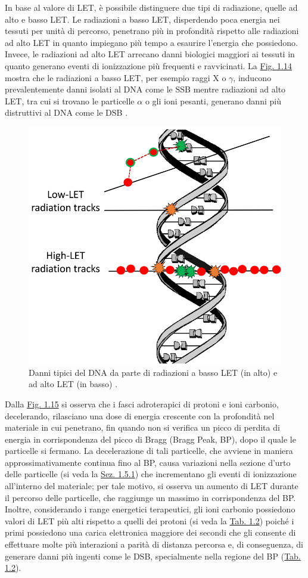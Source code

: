 \documentclass[12pt,a4paper,twoside]{report}
\begin{document}
	In base al valore di LET, è possibile distinguere due tipi di radiazione, quelle ad alto e basso LET. Le radiazioni a basso LET, disperdendo poca energia nei tessuti per unità di percorso, penetrano più in profondità rispetto alle radiazioni ad alto LET in quanto impiegano più tempo a esaurire l'energia che possiedono. Invece, le radiazioni ad alto LET arrecano danni biologici maggiori ai tessuti in quanto generano eventi di ionizzazione più frequenti e ravvicinati. La \hyperref[fig:damage_let]{Fig. 1.14} mostra che le radiazioni a basso LET, per esempio raggi X o $\gamma$, inducono prevalentemente danni isolati al DNA come le SSB mentre radiazioni ad alto LET, tra cui si trovano le particelle $\alpha$ o gli ioni pesanti, generano danni più distruttivi al DNA come le DSB \cite{Roobol2020-fp}.
	\begin{figure}[H]
		\centering
		\includegraphics[width=0.6\linewidth]{damage_let.png}
		\caption{Danni tipici del DNA da parte di radiazioni a basso LET (in alto) e ad alto LET (in basso) \cite{Fabbrizi_Parsons_2022}.}
		\label{fig:damage_let}
	\end{figure}
	Dalla \hyperref[fig:proton_carbon_let]{Fig. 1.15} si osserva che i fasci adroterapici di protoni e ioni carbonio, decelerando, rilasciano una dose di energia crescente con la profondità nel materiale in cui penetrano, fin quando non si verifica un picco di perdita di energia in corrispondenza del picco di Bragg (Bragg Peak, BP), dopo il quale le particelle si fermano. La decelerazione di tali particelle, che avviene in maniera approssimativamente continua fino al BP, causa variazioni nella sezione d'urto delle particelle (si veda la \hyperref[sec:sezione_urto]{Sez. 1.5.1}) che incrementano gli eventi di ionizzazione all'interno del materiale; per tale motivo, si osserva un aumento di LET durante il percorso delle particelle, che raggiunge un massimo in corrispondenza del BP. Inoltre, considerando i range energetici terapeutici, gli ioni carbonio possiedono valori di LET più alti rispetto a quelli dei protoni (si veda la \hyperref[tab:let_rbe]{Tab. 1.2}) poiché i primi possiedono una carica elettronica maggiore dei secondi che gli consente di effettuare molte più interazioni a parità di distanza percorsa e, di conseguenza, di generare danni più ingenti come le DSB, specialmente nella regione del BP (\hyperref[tab:let_rbe]{Tab. 1.2}).
\end{document}
